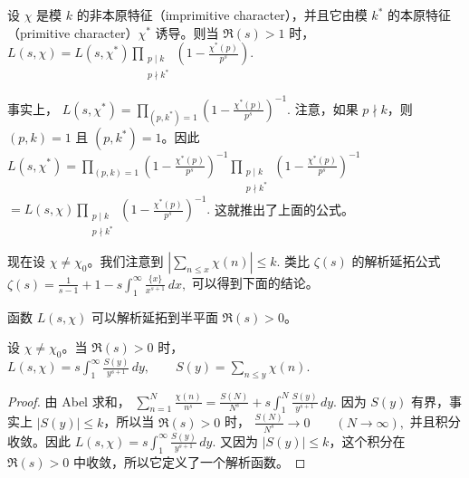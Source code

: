 设 $\chi$ 是模 $k$ 的非本原特征（imprimitive character），并且它由模 $k^*$ 的本原特征（primitive character）$\chi^*$ 诱导。则当 $\Re(s)>1$ 时，
\(\textstyle L(s,\allowbreak{}\chi) =\allowbreak{} L(s,\allowbreak{}\chi^*)\prod_{\substack{p\mid\allowbreak{} k\\ p\nmid k^*}} \left(1-\frac{\chi^*(p)}{p^s}\right).\)

事实上，
\(\textstyle L(s,\allowbreak{}\chi^*) =\allowbreak{} \prod_{(p,\allowbreak{}k^*)=\allowbreak{}1}\left(1-\frac{\chi^*(p)}{p^s}\right)^{-1}.\)
注意，如果 $p\nmid k$，则 $(p,k)=1$ 且 $(p,k^*)=1$。因此
\(\textstyle L(s,\allowbreak{}\chi^*) =\allowbreak{} \prod_{(p,\allowbreak{}k)=\allowbreak{}1}\left(1-\frac{\chi^*(p)}{p^s}\right)^{-1} \prod_{\substack{p\mid\allowbreak{} k\\ p\nmid k^*}} \left(1-\frac{\chi^*(p)}{p^s}\right)^{-1}\) \(\textstyle =\allowbreak{} L(s,\allowbreak{}\chi) \prod_{\substack{p\mid\allowbreak{} k\\ p\nmid k^*}} \left(1-\frac{\chi^*(p)}{p^s}\right)^{-1}.\)
这就推出了上面的公式。

现在设 $\chi\neq \chi_0$。我们注意到
\(\textstyle \left|\sum_{n\leq\allowbreak{} x}\chi(n)\right|\leq\allowbreak{} k.\)
类比 $\zeta(s)$ 的解析延拓公式
\(\textstyle \zeta(s) =\allowbreak{} \frac{1}{s-1}+\allowbreak{}1 -s\int_1^\infty \frac{\{x\}}{x^{s+\allowbreak{}1}}\,dx,\allowbreak{}\)
可以得到下面的结论。

\begin{exercise}
	函数 $L(s,\chi)$ 可以解析延拓到半平面 $\Re(s)>0$。
\end{exercise}

\begin{lemma}
	设 $\chi\neq\chi_0$。当 $\Re(s)>0$ 时，
	\(\textstyle L(s,\allowbreak{}\chi) =\allowbreak{} s\int_1^\infty \frac{S(y)}{y^{s+\allowbreak{}1}}\,dy,\allowbreak{} \qquad S(y)=\allowbreak{}\sum_{n\leq\allowbreak{} y}\chi(n).\)
\end{lemma}

\begin{proof}
	由 Abel 求和，
	\(\textstyle \sum_{n=\allowbreak{}1}^N\frac{\chi(n)}{n^s} =\allowbreak{} \frac{S(N)}{N^s} +\allowbreak{} s\int_1^N\frac{S(y)}{y^{s+\allowbreak{}1}}\,dy.\)
	因为 $S(y)$ 有界，事实上 $|S(y)|\leq k$，所以当 $\Re(s)>0$ 时，
	\(\textstyle \frac{S(N)}{N^s}\longrightarrow\allowbreak{} 0 \qquad (N\to\allowbreak{}\infty),\allowbreak{}\)
	并且积分收敛。因此
	\(\textstyle L(s,\allowbreak{}\chi) =\allowbreak{} s\int_1^\infty\frac{S(y)}{y^{s+\allowbreak{}1}}\,dy.\)
	又因为 $|S(y)|\leq k$，这个积分在 $\Re(s)>0$ 中收敛，所以它定义了一个解析函数。
\end{proof}

